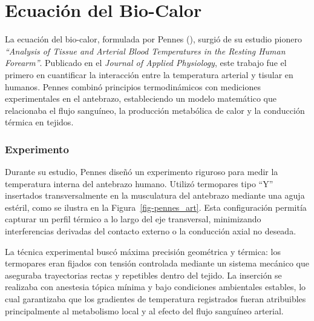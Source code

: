 \documentclass[
  spanish,
  us-letterpaper,
]{scrreprt}
\theoremstyle{plain}
\theoremstyle{definition}
\theoremstyle{remark}
\begin{document}
\part{Ecuación del Bio-Calor}

La ecuación del bio-calor, formulada por Pennes
(), surgió de su estudio pionero
\emph{``Analysis of Tissue and Arterial Blood Temperatures in the
Resting Human Forearm''}. Publicado en el \emph{Journal of Applied
Physiology}, este trabajo fue el primero en cuantificar la interacción
entre la temperatura arterial y tisular en humanos. Pennes combinó
principios termodinámicos con mediciones experimentales en el antebrazo,
estableciendo un modelo matemático que relacionaba el flujo sanguíneo,
la producción metabólica de calor y la conducción térmica en tejidos.

\section*{Experimento}\label{experimento}


Durante su estudio, Pennes diseñó un experimento riguroso para medir la
temperatura interna del antebrazo humano. Utilizó termopares tipo ``Y''
insertados transversalmente en la musculatura del antebrazo mediante una
aguja estéril, como se ilustra en la Figura~\ref{fig-pennes_art}. Esta
configuración permitía capturar un perfil térmico a lo largo del eje
transversal, minimizando interferencias derivadas del contacto externo o
la conducción axial no deseada.

La técnica experimental buscó máxima precisión geométrica y térmica: los
termopares eran fijados con tensión controlada mediante un sistema
mecánico que aseguraba trayectorias rectas y repetibles dentro del
tejido. La inserción se realizaba con anestesia tópica mínima y bajo
condiciones ambientales estables, lo cual garantizaba que los gradientes
de temperatura registrados fueran atribuibles principalmente al
metabolismo local y al efecto del flujo sanguíneo arterial.
\end{document}
